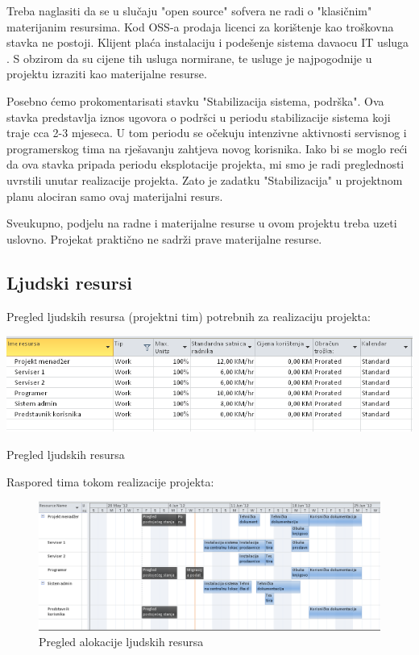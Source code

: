 \documentclass[times, utf8, seminar]{fit}
\begin{document}
Treba naglasiti da se u slučaju "open source" sofvera ne radi o "klasičnim" materijanim resursima. Kod OSS-a prodaja licenci za korištenje kao troškovna stavka ne postoji. Klijent plaća instalaciju i podešenje sistema davaocu IT usluga . S obzirom da su cijene tih usluga normirane, te usluge je najpogodnije u projektu izraziti kao materijalne resurse. 

Posebno ćemo prokomentarisati stavku "Stabilizacija sistema, podrška". Ova stavka predstavlja iznos ugovora o podršci u periodu stabilizacije sistema koji traje cca 2-3 mjeseca. U tom periodu se očekuju intenzivne aktivnosti servisnog i programerskog tima na rješavanju zahtjeva novog korisnika. Iako bi se moglo reći da ova stavka pripada periodu eksplotacije projekta, mi smo je radi preglednosti uvrstili unutar realizacije projekta. Zato je zadatku "Stabilizacija" u projektnom planu alociran samo ovaj materijalni resurs. 

Sveukupno, podjelu na radne i materijalne resurse u ovom projektu treba uzeti uslovno. Projekat praktično ne sadrži prave materijalne resurse.

\subsection{Ljudski resursi}
Pregled ljudskih resursa (projektni tim) potrebnih za realizaciju projekta:

\begin{table}[!h]
\centering
\includegraphics[width=15.5cm]{img/ljudski_resursi.png}
\caption{Pregled ljudskih resursa}
\end{table}

Raspored tima tokom realizacije projekta:

\begin{figure}[!h]
\centering
\includegraphics[width=15.5cm]{img/team_planner.png}
\caption{Pregled alokacije ljudskih resursa}
\end{figure}
\end{document}
